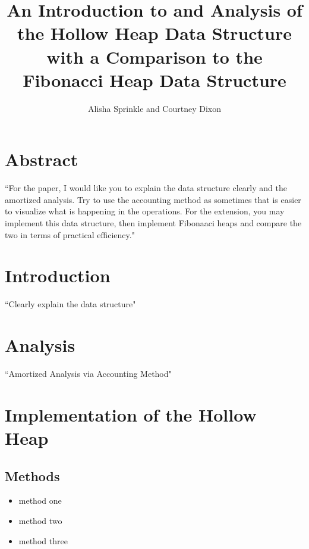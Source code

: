 \documentclass[letter,10pt]{article}
\begin{document}
\title{An Introduction to and Analysis of the Hollow Heap Data Structure with a Comparison to the Fibonacci Heap Data Structure}
\author{Alisha Sprinkle and Courtney Dixon}
\date{}
\maketitle

\section{Abstract}
``For the paper, I would like you to explain the data structure clearly and the amortized analysis. Try to use the accounting method as sometimes that is easier to visualize what is happening in the operations. For the extension, you may implement this data structure, then implement Fibonaaci heaps and compare the two in terms of practical efficiency."

\section{Introduction}
``Clearly explain the data structure"

\section{Analysis}
``Amortized Analysis via Accounting Method"

\section{Implementation of the Hollow Heap}
\subsection{Methods}
\begin{itemize}
    \item method one
    \item method two
    \item method three
\end{itemize}
\end{document}
